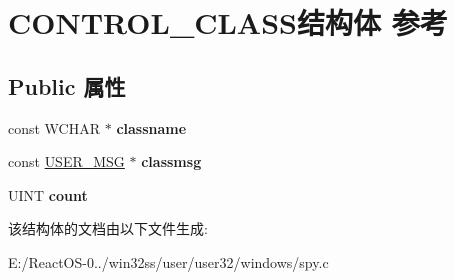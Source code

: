 \hypertarget{struct_c_o_n_t_r_o_l___c_l_a_s_s}{}\section{C\+O\+N\+T\+R\+O\+L\+\_\+\+C\+L\+A\+S\+S结构体 参考}
\label{struct_c_o_n_t_r_o_l___c_l_a_s_s}
\subsection*{Public 属性}
\begin{DoxyCompactItemize}
\item 
\mbox{\label{struct_c_o_n_t_r_o_l___c_l_a_s_s_a00db770de9c7ac9c7003707812eee480}} 
const W\+C\+H\+AR $\ast$ {\bfseries classname}
\item 
\mbox{\label{struct_c_o_n_t_r_o_l___c_l_a_s_s_a7303e6f2b801c818822c46a593e0bd6b}} 
const \hyperlink{struct_u_s_e_r___m_s_g}{U\+S\+E\+R\+\_\+\+M\+SG} $\ast$ {\bfseries classmsg}
\item 
\mbox{\label{struct_c_o_n_t_r_o_l___c_l_a_s_s_a8ae1619ebff457e86c9cb46e9d9bd43f}} 
U\+I\+NT {\bfseries count}
\end{DoxyCompactItemize}


该结构体的文档由以下文件生成\+:\begin{DoxyCompactItemize}
\item 
E\+:/\+React\+O\+S-\/0../win32ss/user/user32/windows/spy.\+c\end{DoxyCompactItemize}
